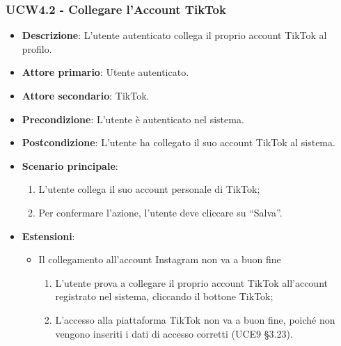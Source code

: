 \subsubsection{UCW4.2 - Collegare l'Account TikTok}
\begin{itemize}
\item \textbf{Descrizione}: L'utente autenticato collega il proprio account TikTok al profilo.
\item \textbf{Attore primario}: Utente autenticato.
\item \textbf{Attore secondario}: TikTok.
\item \textbf{Precondizione}: L’utente è autenticato nel sistema.
\item \textbf{Postcondizione}: L’utente ha collegato il suo account TikTok al sistema.

\item \textbf{Scenario principale}:
\begin{enumerate}
\item L’utente collega il suo account personale di TikTok;
\item Per confermare l’azione, l’utente deve cliccare su “Salva”. 
\end{enumerate}

\item \textbf{Estensioni}:
\begin{itemize}
\item Il collegamento all’account Instagram non va a buon fine
\begin{enumerate}
	\item L’utente prova a collegare il proprio account TikTok all’account registrato nel sistema, cliccando il bottone TikTok;
	\item L’accesso alla piattaforma TikTok non va a buon fine, poiché non vengono inseriti i dati di accesso corretti (UCE9 §3.23).
\end{enumerate}
\end{itemize}
\end{itemize}

